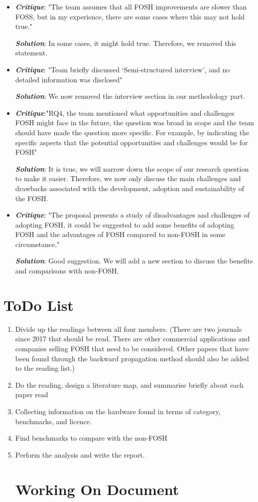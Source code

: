 \documentclass[acmtog]{acmart}
\begin{document}
\begin{itemize}
\item {\textbf{\itshape Critique}}: "The team assumes that all FOSH improvements are slower than FOSS, but in my experience, there are some cases where this may not hold true." 
\par{\textbf{\itshape Solution}}: In some cases, it might hold true. Therefore, we removed this statement.
\item {\textbf{\itshape Critique}}: "Team briefly discussed ‘Semi-structured interview’, and no detailed information was disclosed" 
\par{\textbf{\itshape Solution}}: We now removed the interview section in our methodology part. 
\item {\textbf{\itshape Critique}}:"RQ4, the team mentioned what opportunities and challenges FOSH might face in the future, the question was broad in scope and the team should have made the question more specific. For example, by indicating the specific aspects that the potential opportunities and challenges would be for FOSH" 
\par{\textbf{\itshape Solution}}: It is true, we will narrow down the scope of our research question to make it easier. Therefore, we now only discuss the main challenges and drawbacks associated with the development, adoption and sustainability of the FOSH.  
\item {\textbf{\itshape Critique}}: "The proposal presents a study of disadvantages and challenges of adopting FOSH, it could be suggested to add some benefits of adopting FOSH and the advantages of FOSH compared to non-FOSH in some circumstance." 
\par{\textbf{\itshape Solution}}: Good suggestion. We will add a new section to discuss the benefits and comparisons with non-FOSH.


\end{itemize}

\section{ToDo List}
\begin{enumerate}
\item Divide up the readings between all four members. (There are two journals since 2017 that should be read. 
There are other commercial applications and companies selling FOSH that need to be considered. Other papers that have been found through the backward propagation method should also be added to the reading list.)
\item Do the reading, design a literature map, and summarise briefly about each paper read
\item Collecting information on the hardware found in terms of category, benchmarks, and licence. 
\item Find benchmarks to compare with the non-FOSH
\item Perform the analysis and write the report.

\section{Working On Document}
\label{sec:C}
\end{enumerate}
\end{document}
